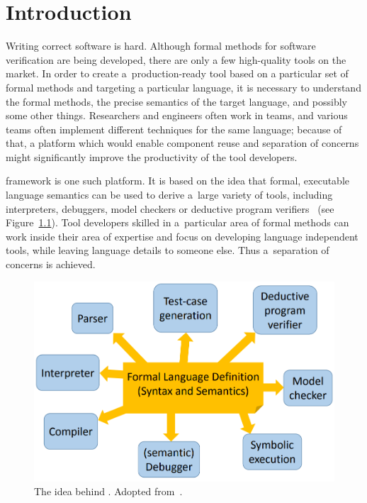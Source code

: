 \documentclass[nolot,nolof,nocover,printed]{fithesis3}
\begin{document}

\chapter{Introduction}

Writing correct software is hard.
Although formal methods for software verification are being developed, there are only a few high-quality tools on the market. In order to create a~production-ready tool based on a particular set of formal methods and targeting a particular language, it is necessary to understand the formal methods, the precise semantics of the target language, and possibly some other things. Researchers and engineers often work in teams, and various teams often implement different techniques for the same language; because of that, a platform which would enable component reuse and separation of concerns might significantly improve the productivity of the tool developers.

\K framework is one such platform. It is based on the idea that formal, executable language semantics can be used to derive a~large variety of tools, including interpreters, debuggers, model checkers or deductive program verifiers~\cite{rosu-2017-marktoberdorf} (see Figure~\ref{kidea}). Tool developers skilled in a~particular area of formal methods can work inside their area of expertise and focus on developing language independent tools, while leaving language details to someone else. Thus a~separation of concerns is achieved.

\begin{figure}[ht]
\centering
\includegraphics[width=0.7\linewidth]{img/kidea.png}
\caption[The \K idea]{The idea behind \K. Adopted from~\cite{rosu-2015-meseguer}.}
\label{kidea}
\end{figure}
\end{document}
